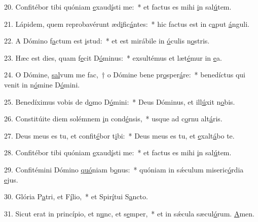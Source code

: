20. Confitébor tibi quóniam \uline{e}xaud\uline{í}sti me:~* et factus es mihi \uline{i}n sal\uline{ú}tem.\par 
21. Lápidem, quem reprobavérunt æd\uline{i}fic\uline{á}ntes:~* hic factus est in c\uline{a}put \uline{á}nguli.\par 
22. A Dómino f\uline{a}ctum est \uline{i}stud:~* et est mirábile in \uline{ó}culis n\uline{o}stris.\par 
23. Hæc est dies, quam f\uline{e}cit D\uline{ó}minus:~* exsultémus et læt\uline{é}mur in \uline{e}a.\par 
24. O Dómine, \uline{sal}vum me fac,~† o Dómine bene pr\uline{o}sper\uline{á}re:~* benedíctus qui venit in n\uline{ó}mine D\uline{ó}mini.\par 
25. Benedíximus vobis de d\uline{o}mo D\uline{ó}mini:~* Deus Dóminus, et ill\uline{ú}xit n\uline{o}bis.\par 
26. Constitúite diem solémnem \uline{i}n cond\uline{é}nsis,~* usque ad c\uline{o}rnu alt\uline{á}ris.\par 
27. Deus meus es tu, et confit\uline{é}bor t\uline{i}bi:~* Deus meus es tu, et \uline{e}xalt\uline{á}bo te.\par 
28. Confitébor tibi quóniam \uline{e}xaud\uline{í}sti me:~* et factus es mihi \uline{i}n sal\uline{ú}tem.\par 
29. Confitémini Dómino \uline{quó}niam b\uline{o}nus:~* quóniam in sǽculum miseric\uline{ó}rdia \uline{e}jus.\par 
30. Glória P\uline{a}tri, et F\uline{í}lio,~* et Spir\uline{í}tui S\uline{a}ncto.\par 
31. Sicut erat in princípio, et n\uline{u}nc, et s\uline{e}mper,~* et in sǽcula sæcul\uline{ó}rum. \uline{A}men.\par 
